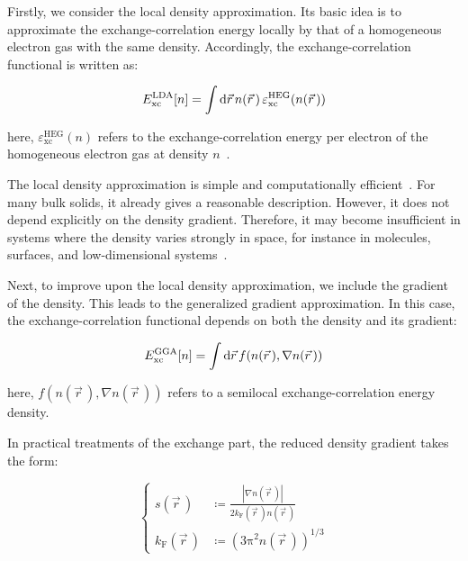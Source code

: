 Firstly, we consider the local density approximation.
Its basic idea is to approximate the exchange-correlation energy locally by that of a homogeneous electron gas with the same density.
Accordingly, the exchange-correlation functional is written as:

\begin{equation}
    E_\mathrm{xc}^\mathrm{LDA}[n]
    = \int\mathrm{d}{\vec{r}}\,n(\vec{r}\,)\,\varepsilon_\mathrm{xc}^\mathrm{HEG}(n(\vec{r}\,))
\label{LDA_exchange_correlation_functional}
\end{equation}

here, $\varepsilon_\mathrm{xc}^\mathrm{HEG}(n)$ refers to the exchange-correlation energy per electron of the homogeneous electron gas at density $n$~\cite{dirac1930note,perdew1992accurate}.

The local density approximation is simple and computationally efficient~\cite{jones2015density,stampfl1999density}.
For many bulk solids, it already gives a reasonable description.
However, it does not depend explicitly on the density gradient.
Therefore, it may become insufficient in systems where the density varies strongly in space,
for instance in molecules, surfaces, and low-dimensional systems~\cite{martin2020electronic,li2003insights}.

Next, to improve upon the local density approximation,
we include the gradient of the density.
This leads to the generalized gradient approximation.
In this case, the exchange-correlation functional depends on both the density and its gradient:

\begin{equation}
    E_\mathrm{xc}^\mathrm{GGA}[n]
    = \int\mathrm{d}{\vec{r}}\,f(n(\vec{r}\,),\nabla n(\vec{r}\,))
\label{GGA_exchange_correlation_functional}
\end{equation}

here, $f(n(\vec{r}\,),\nabla n(\vec{r}\,))$ refers to a semilocal exchange-correlation energy density.

In practical treatments of the exchange part,
the reduced density gradient takes the form:

\begin{equation}
\left\{\begin{aligned}
    s(\vec{r}\,)&\coloneqq\frac{|\nabla n(\vec{r}\,)|}{2k_\mathrm{F}(\vec{r}\,)n(\vec{r}\,)}   \\
    k_\mathrm{F}(\vec{r}\,)&\coloneqq\left(3\mathrm{\pi}^2 n(\vec{r}\,)\right)^{1/3}
\end{aligned}\right.
\label{reduced_density_gradient_definition}
\end{equation}

